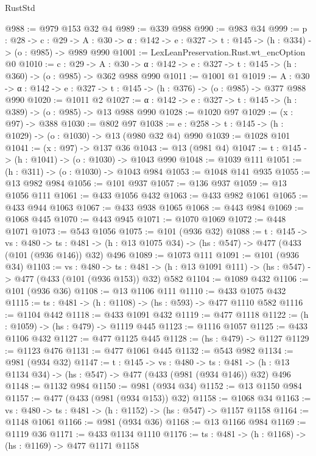 \begin{lexlean}{RustStd}
\begin{coremodule}
{\begin{coremodule}
{{{{{{{{{{{{{{{{@988 := @979 @153 @32 @4
@989 := @339 @988
@990 := @983 @34
@999 := {p : @28} ->
  {c : @29} ->
  {A : @30} -> {α : @142} -> {e : @327} -> {t : @145} -> (h : @334) -> (o : @985) -> @989 @990
@1001 := LexLeanPreservation.Rust.wt_encOption @0
@1010 := {c : @29} ->
  {A : @30} -> {α : @142} -> {e : @327} -> {t : @145} -> (h : @360) -> (o : @985) -> @362 @988 @990
@1011 := @1001 @1
@1019 := {A : @30} ->
  {α : @142} -> {e : @327} -> {t : @145} -> (h : @376) -> (o : @985) -> @377 @988 @990
@1020 := @1011 @2
@1027 := {α : @142} -> {e : @327} -> {t : @145} -> (h : @389) -> (o : @985) -> @13 @988 @990
@1028 := @1020 @97
@1029 := (x : @97) -> @388
@1030 := @802 @97
@1038 := {e : @258} -> {t : @145} -> (h : @1029) -> (o : @1030) -> @13 (@980 @32 @4) @990
@1039 := @1028 @101
@1041 := (x : @97) -> @137 @36
@1043 := @13 (@981 @4)
@1047 := {t : @145} -> (h : @1041) -> (o : @1030) -> @1043 @990
@1048 := @1039 @111
@1051 := (h : @311) -> (o : @1030) -> @1043 @984
@1053 := @1048 @141 @935
@1055 := @13 @982 @984
@1056 := @101 @937
@1057 := @136 @937
@1059 := @13 @1056 @111
@1061 := @433 @1056 @432
@1063 := @433 @982 @1061
@1065 := @433 @944 @1063
@1067 := @433 @938 @1065
@1068 := @443 @984
@1069 := @1068 @445
@1070 := @443 @945
@1071 := @1070 @1069
@1072 := @448 @1071
@1073 := @543 @1056
@1075 := @101 (@936 @32)
@1088 := {t : @145} ->
  {vs : @480} ->
  {ts : @481} -> (h : @13 @1075 @34) -> (hs : @547) -> @477 (@433 (@101 (@936 @146)) @32) @496
@1089 := @1073 @111
@1091 := @101 (@936 @34)
@1103 := {vs : @480} ->
  {ts : @481} -> (h : @13 @1091 @111) -> (hs : @547) -> @477 (@433 (@101 (@936 @153)) @32) @582
@1104 := @1089 @432
@1106 := @101 (@936 @36)
@1108 := @13 @1106 @111
@1110 := @433 @1075 @432
@1115 := {ts : @481} -> (h : @1108) -> (hs : @593) -> @477 @1110 @582
@1116 := @1104 @442
@1118 := @433 @1091 @432
@1119 := @477 @1118
@1122 := (h : @1059) -> (hs : @479) -> @1119 @445
@1123 := @1116 @1057
@1125 := @433 @1106 @432
@1127 := @477 @1125 @445
@1128 := (hs : @479) -> @1127
@1129 := @1123 @476
@1131 := @477 @1061 @445
@1132 := @543 @982
@1134 := @981 (@934 @32)
@1147 := {t : @145} ->
  {vs : @480} ->
  {ts : @481} -> (h : @13 @1134 @34) -> (hs : @547) -> @477 (@433 (@981 (@934 @146)) @32) @496
@1148 := @1132 @984
@1150 := @981 (@934 @34)
@1152 := @13 @1150 @984
@1157 := @477 (@433 (@981 (@934 @153)) @32)
@1158 := @1068 @34
@1163 := {vs : @480} -> {ts : @481} -> (h : @1152) -> (hs : @547) -> @1157 @1158
@1164 := @1148 @1061
@1166 := @981 (@934 @36)
@1168 := @13 @1166 @984
@1169 := @1119 @36
@1171 := @433 @1134 @1110
@1176 := {ts : @481} -> (h : @1168) -> (hs : @1169) -> @477 @1171 @1158
}}}}}}}}}}}}}}}}
\end{coremodule}}
\end{coremodule}
\end{lexlean}
